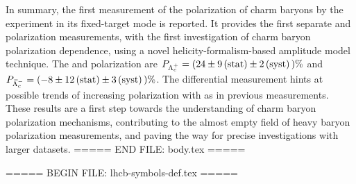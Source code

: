In summary, the first measurement of the polarization of charm baryons by the \lhcb experiment in its fixed-target mode is reported. It provides the first separate \Lc and \Lcbar polarization measurements, with the first investigation of charm baryon \xf polarization dependence, using a novel helicity-formalism-based amplitude model technique. The \Lc and \Lcbar polarization are \mbox{$P_{{\Lambda}^+_{c}} = ( 24 \pm 9 \, (\rm{stat}) \pm 2 \, (\rm{syst}) \, )\%$} and \mbox{$P_{{\kern 0.18em\overline{\kern -0.18em \Lambda}}{}^-_{c}} = (-8 \pm 12 \, (\rm{stat}) \pm 3 \,(\rm{syst}) \, ) \%$}. The differential measurement hints at possible trends of increasing \Lc polarization with \pt as in previous measurements. These results are a first step towards the understanding of charm baryon polarization mechanisms, contributing to the almost empty field of heavy baryon polarization measurements, and paving the way for precise investigations with larger datasets.
===== END FILE: body.tex =====

===== BEGIN FILE: lhcb-symbols-def.tex =====























\usepackage{xspace}
\usepackage{upgreek}



















\def\lhcb   {\mbox{LHCb}\xspace}
\def\atlas  {\mbox{ATLAS}\xspace}
\def\cms    {\mbox{CMS}\xspace}
\def\alice  {\mbox{ALICE}\xspace}
\def\babar  {\mbox{BaBar}\xspace}
\def\belle  {\mbox{Belle}\xspace}
\def\belletwo {\mbox{Belle~II}\xspace}
\def\besiii {\mbox{BESIII}\xspace}
\def\cleo   {\mbox{CLEO}\xspace}
\def\cdf    {\mbox{CDF}\xspace}
\def\dzero  {\mbox{D0}\xspace}
\def\aleph  {\mbox{ALEPH}\xspace}
\def\delphi {\mbox{DELPHI}\xspace}
\def\opal   {\mbox{OPAL}\xspace}
\def\lthree {\mbox{L3}\xspace}
\def\sld    {\mbox{SLD}\xspace}




